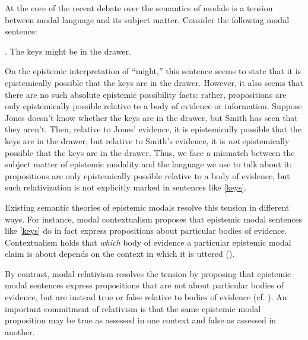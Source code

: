 \documentclass[11pt]{article}
\begin{document}
\begin{doublespace}

\noindent At the core of the recent debate over the semantics of modals is a tension between modal language and its subject matter. Consider the following modal sentence:

\ex. The keys might be in the drawer.\label{keys}

On the epistemic interpretation of ``might,'' this sentence seems to state that it is epistemically possible that the keys are in the drawer. However, it also seems that there are no such absolute epistemic possibility facts: rather, propositions are only epistemically possible relative to a body of evidence or information. Suppose Jones doesn't know whether the keys are in the drawer, but Smith has seen that they aren't. Then, relative to Jones' evidence, it is epistemically possible that the keys are in the drawer, but relative to Smith's evidence, it is \textit{not} epistemically possible that the keys are in the drawer. Thus, we face a mismatch between the subject matter of epistemic modality and the language we use to talk about it: propositions are only epistemically possible relative to a body of evidence, but such relativization is not explicitly marked in  sentences like \ref{keys}.%



Existing semantic theories of epistemic modals resolve this tension in different ways. For instance, modal contextualism proposes that epistemic modal sentences like \ref{keys} do in fact express propositions about particular bodies of evidence. Contextualism holds that {\it which} body of evidence a particular epistemic modal claim is about depends on the context in which it is uttered (\citealt{hacking:1967, kratzer:1981, kratzer:1991, derose:1991, stanley:2005b, dowell:2011}). 

By contrast, modal relativism resolves the tension by proposing that epistemic modal sentences express propositions that are not about particular bodies of evidence, but are instead true or false relative to bodies of evidence (cf. \citealt{egan:2005, egan:2007, macfarlane:2011a, macfarlane:2014a}). An important commitment of relativism is that the same epistemic modal proposition may be true as assessed in one context and false as assessed in another. 


\end{doublespace}
\end{document}
